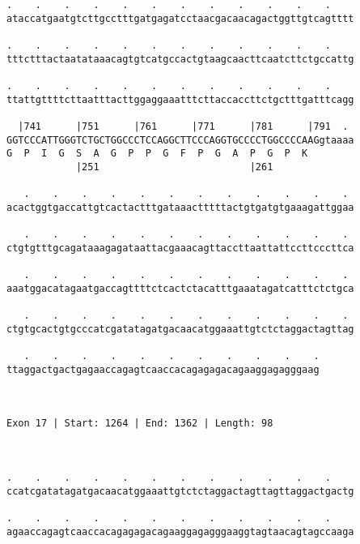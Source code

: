 \documentclass{article}
\begin{document}
\begin{Verbatim}
.    .    .    .    .    .    .    .    .    .    .    .    
ataccatgaatgtcttgcctttgatgagatcctaacgacaacagactggttgtcagtttt
                                                            
.    .    .    .    .    .    .    .    .    .    .    .    
tttctttactaatataaacagtgtcatgccactgtaagcaacttcaatcttctgccattg
                                                            
.    .    .    .    .    .    .    .    .    .    .    .    
ttattgttttcttaatttacttggaggaaatttcttaccaccttctgctttgatttcagg
                                                            
  |741      |751      |761      |771      |781      |791  . 
GGTCCCATTGGGTCTGCTGGCCCTCCAGGCTTCCCAGGTGCCCCTGGCCCCAAGgtaaaa
G  P  I  G  S  A  G  P  P  G  F  P  G  A  P  G  P  K        
            |251                          |261              
  
   .    .    .    .    .    .    .    .    .    .    .    . 
acactggtgaccattgtcactactttgataaactttttactgtgatgtgaaagattggaa
                                                            
   .    .    .    .    .    .    .    .    .    .    .    . 
ctgtgtttgcagataaagagataattacgaaacagttaccttaattattccttcccttca
                                                            
   .    .    .    .    .    .    .    .    .    .    .    . 
aaatggacatagaatgaccagttttctcactctacatttgaaatagatcatttctctgca
                                                            
   .    .    .    .    .    .    .    .    .    .    .    . 
ctgtgcactgtgcccatcgatatagatgacaacatggaaattgtctctaggactagttag
                                                            
   .    .    .    .    .    .    .    .    .    .    .
ttaggactgactgagaaccagagtcaaccacagagagacagaaggagagggaag
                                                      
                                                      
 
Exon 17 | Start: 1264 | End: 1362 | Length: 98



.    .    .    .    .    .    .    .    .    .    .    .    
ccatcgatatagatgacaacatggaaattgtctctaggactagttagttaggactgactg
                                                            
.    .    .    .    .    .    .    .    .    .    .    .    
agaaccagagtcaaccacagagagacagaaggagagggaaggtagtaacagtagccaaga
                                                            

\end{Verbatim}
\end{document}
